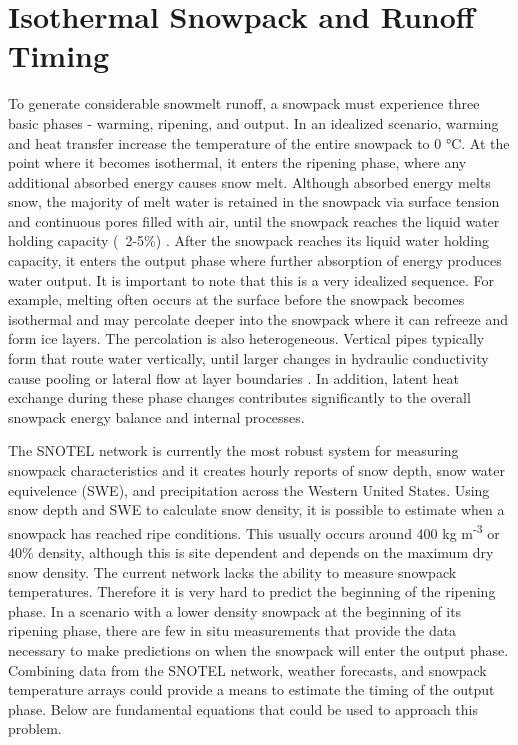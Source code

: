 \section{Isothermal Snowpack and Runoff Timing}
To generate considerable snowmelt runoff, a snowpack must experience three basic phases - warming, ripening, and output. In an idealized scenario, warming and heat transfer increase the temperature of the entire snowpack to 0 °C. At the point where it becomes isothermal, it enters the ripening phase, where any additional absorbed energy causes snow melt. Although absorbed energy melts snow, the majority of melt water is retained in the snowpack via surface tension and continuous pores filled with air, until the snowpack reaches the liquid water holding capacity (~2-5\%) \citep{dingman2015}. After the snowpack reaches its liquid water holding capacity, it enters the output phase where further absorption of energy produces water output. It is important to note that this is a very idealized sequence. For example, melting often occurs at the surface before the snowpack becomes isothermal and may percolate deeper into the snowpack where it can refreeze and form ice layers. The percolation is also heterogeneous.  Vertical pipes typically form that route water vertically, until larger changes in hydraulic conductivity cause pooling or lateral flow at layer boundaries \citep{evans2016isotopic, eiriksson2013evaluation}. In addition, latent heat exchange during these phase changes contributes significantly to the overall snowpack energy balance and internal processes. 

The SNOTEL network is currently the most robust system for measuring snowpack characteristics and it creates hourly reports of snow depth, snow water equivelence (SWE), and precipitation across the Western United States. Using snow depth and SWE to calculate snow density, it is possible to estimate when a snowpack has reached ripe conditions. This usually occurs around 400 kg m\textsuperscript{-3} or 40\% density, although this is site dependent and depends on the maximum dry snow density. The current network lacks the ability to measure snowpack temperatures. Therefore it is very hard to predict the beginning of the ripening phase. In a scenario with a lower density snowpack at the beginning of its ripening phase, there are few in situ measurements that provide the data necessary to make predictions on when the snowpack will enter the output phase. Combining data from the SNOTEL network, weather forecasts, and snowpack temperature arrays could provide a means to estimate the timing of the output phase. Below are fundamental equations that could be used to approach this problem. 

